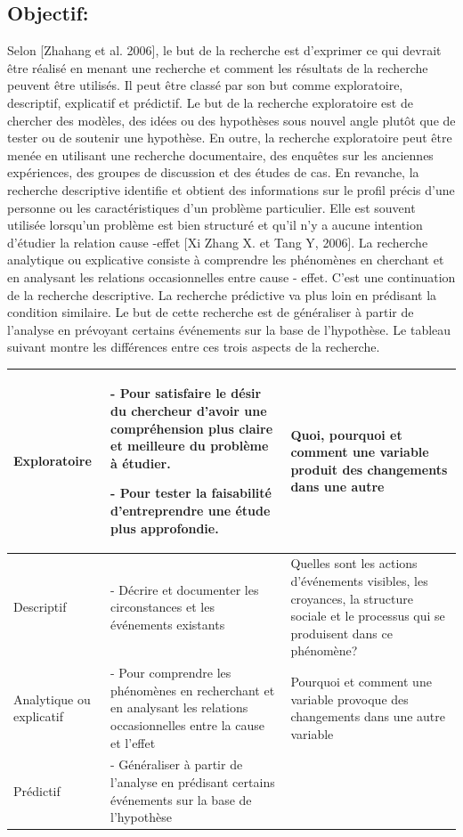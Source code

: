\documentclass[12pt]{article}
\begin{document}
{\subsection{Objectif:}
Selon {\color{red}[Zhahang et al. 2006]}, le but de la recherche est d'exprimer ce qui devrait être réalisé en menant une recherche et comment les résultats de la recherche peuvent être utilisés. Il peut être classé par son but comme exploratoire, descriptif, explicatif et prédictif. Le but de la recherche exploratoire est de chercher des modèles, des idées ou des hypothèses sous nouvel angle plutôt que de tester ou de soutenir une hypothèse. En outre, la recherche exploratoire peut être menée en utilisant une recherche documentaire, des enquêtes sur les anciennes expériences, des groupes de discussion et des études de cas.
En revanche, la recherche descriptive identifie et obtient des informations sur le profil précis d'une personne ou les caractéristiques d'un problème particulier. Elle est souvent utilisée lorsqu'un problème est bien structuré et qu'il n'y a aucune intention d'étudier la relation cause -effet {\color{red}[Xi Zhang X. et Tang Y, 2006]}.
La recherche analytique ou explicative consiste à comprendre les phénomènes en cherchant et en analysant les relations occasionnelles entre cause - effet. C'est une continuation de la recherche descriptive.
La recherche prédictive va plus loin en prédisant la condition similaire. Le but de cette recherche est de généraliser à partir de l'analyse en prévoyant certains événements sur la base de l'hypothèse. Le tableau suivant montre les différences entre ces trois aspects de la recherche.

\begin{center}
\begin{tabular}{|p{3cm}|p{6cm}|p{6cm}|}
\hline
   Exploratoire& - Pour satisfaire le désir du chercheur d'avoir une compréhension plus claire et meilleure du problème à étudier.
   
- Pour tester la faisabilité d'entreprendre une étude plus approfondie.
 & Quoi, pourquoi et comment une variable produit des changements dans une autre \\
  \hline
   Descriptif&- Décrire et documenter les circonstances et les événements existants  & Quelles sont les actions d'événements visibles, les croyances, la structure sociale et le processus qui se produisent dans ce phénomène? \\
  \hline
   Analytique ou explicatif&- Pour comprendre les phénomènes en recherchant et en analysant les relations occasionnelles entre la cause et l'effet  & Pourquoi et comment une variable provoque des changements dans une autre variable  \\
  \hline
 Prédictif& - Généraliser à partir de l'analyse en prédisant certains événements sur la base de l'hypothèse &  \\
  \hline
  

\end{tabular}
\end{center}}
\end{document}
